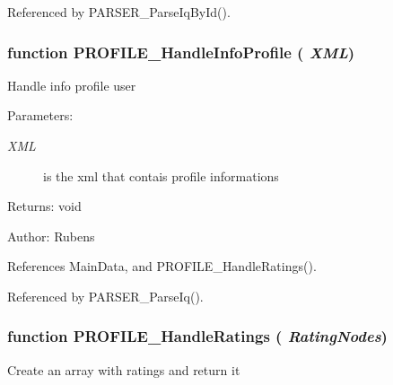 Referenced by PARSER\_\-ParseIqById().
\subsubsection{\setlength{\rightskip}{0pt plus 5cm}function PROFILE\_\-HandleInfoProfile ( {\em XML})}\label{profile_2profile_8js_853546e8112fab89a1f1cc1e1736f6a3}


Handle info profile user

\begin{Desc}
\item[Parameters:]
\begin{description}
\item[{\em XML}]is the xml that contais profile informations \end{description}
\end{Desc}
\begin{Desc}
\item[Returns:]void \end{Desc}
\begin{Desc}
\item[Author:]Rubens \end{Desc}


References MainData, and PROFILE\_\-HandleRatings().

Referenced by PARSER\_\-ParseIq().
\subsubsection{\setlength{\rightskip}{0pt plus 5cm}function PROFILE\_\-HandleRatings ( {\em RatingNodes})}\label{profile_2profile_8js_104385685036897b559e94a7f599c9f5}


Create an array with ratings and return it

